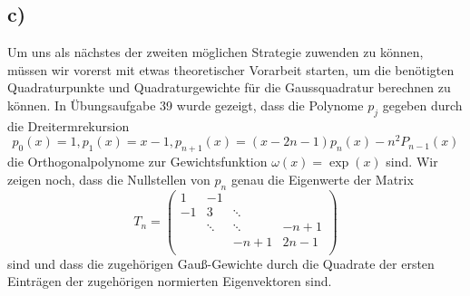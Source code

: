 \subsection*{c)}
Um uns als nächstes der zweiten möglichen Strategie zuwenden zu können, müssen wir vorerst mit etwas theoretischer Vorarbeit starten, um die benötigten Quadraturpunkte und Quadraturgewichte für die Gaussquadratur berechnen zu können.
In Übungsaufgabe 39 wurde gezeigt, dass die Polynome $p_j$ gegeben durch die Dreitermrekursion
\[ p_0(x) = 1, p_1(x) = x - 1, p_{n+1}(x) = (x - 2n - 1)p_n(x) - n^2P_{n-1}(x)\]
die Orthogonalpolynome zur Gewichtsfunktion $\omega(x) = \exp(x)$ sind. Wir zeigen noch, dass die Nullstellen von $p_n$ genau die Eigenwerte der Matrix
\[T_n = \left(\begin{array}{rrrr}                                
1 & -1 & & \\                                               
-1 & 3 &\ddots& \\                                               
&\ddots&\ddots& -n + 1 \\
& & -n + 1 & 2n - 1 \\
\end{array}\right)\]
sind und dass die zugehörigen Gauß-Gewichte durch die Quadrate der ersten Einträgen der zugehörigen normierten Eigenvektoren sind.

